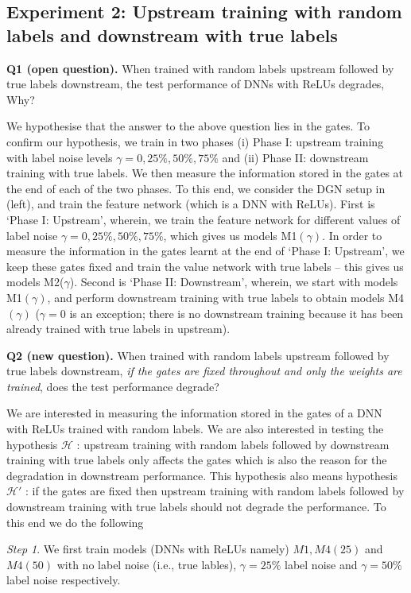 \subsection{Experiment 2: Upstream training with random labels and downstream with true labels}


\textbf{Q1 (open question).} {When trained with random labels upstream followed by true labels downstream, the test performance of DNNs with ReLUs degrades, Why?}

We hypothesise that the answer to the above question lies in the gates. To confirm our hypothesis, we train in two phases (i) Phase I: upstream training with label noise levels $\gamma=0, 25\%, 50\%, 75\%$ and (ii) Phase II: downstream training with true labels. We then measure the information stored in the gates at the end of each of the two phases. To this end, we consider the DGN setup in  (left), and train the feature network (which is a DNN with ReLUs). First is `Phase I: Upstream', wherein, we train the feature network for different values of label noise $\gamma=0, 25\%, 50\%, 75\%$, which gives us models M1$(\gamma)$. In order to measure the information in the gates learnt at the end of `Phase I: Upstream', we keep these gates fixed and train the value network with true labels -- this gives us models M2($\gamma$). Second is `Phase II: Downstream', wherein, we start with models M1$(\gamma)$, and perform downstream training with true labels to obtain models M4$(\gamma)$ ($\gamma=0$ is an exception; there is no downstream training because it has been already trained with true labels in upstream).

\textbf{Q2 (new question).} {When trained with random labels upstream followed by true labels downstream, \emph{if the gates are fixed throughout and only the weights are trained}, does the test performance degrade?}


We are interested in measuring the information stored in the gates of a DNN with ReLUs trained with random labels. We are also interested in testing the hypothesis $\mathcal{H}$ : upstream training with random labels followed by downstream training with true labels only affects the gates which is also the reason for the degradation in downstream performance. This hypothesis also means hypothesis $\mathcal{H'}$ : if the gates are fixed then upstream training with random labels followed by downstream training with true labels should not degrade the performance. To this end we do the following

\indent \emph{Step 1}. We first train models (DNNs with ReLUs namely) $M1, M4(25)$ and $M4(50)$ with no label noise (i.e., true lables), $\gamma=25\%$ label noise and $\gamma =50\%$ label noise respectively.

